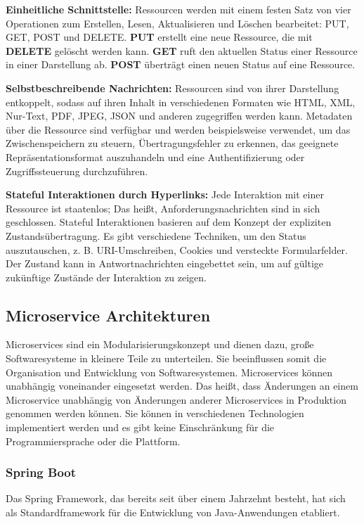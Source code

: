 \textbf{Einheitliche Schnittstelle:} Ressourcen werden mit einem festen Satz von vier Operationen zum Erstellen, Lesen, Aktualisieren und Löschen bearbeitet: PUT, GET, POST und DELETE. \textbf{PUT} erstellt eine neue Ressource, die mit \textbf{DELETE} gelöscht werden kann. \textbf{GET} ruft den aktuellen Status einer Ressource in einer Darstellung ab. \textbf{POST} überträgt einen neuen Status auf eine Ressource.

\textbf{Selbstbeschreibende Nachrichten:} Ressourcen sind von ihrer Darstellung entkoppelt, sodass auf ihren Inhalt in verschiedenen Formaten wie HTML, XML, Nur-Text, PDF, JPEG, JSON und anderen zugegriffen werden kann. Metadaten über die Ressource sind verfügbar und werden beispielsweise verwendet, um das Zwischenspeichern zu steuern, Übertragungsfehler zu erkennen, das geeignete Repräsentationsformat auszuhandeln und eine Authentifizierung oder Zugriffssteuerung durchzuführen.

\textbf{Stateful Interaktionen durch Hyperlinks:} Jede Interaktion mit einer Ressource ist staatenlos; Das heißt, Anforderungsnachrichten sind in sich geschlossen. Stateful Interaktionen basieren auf dem Konzept der expliziten Zustandsübertragung. Es gibt verschiedene Techniken, um den Status auszutauschen, z. B. URI-Umschreiben, Cookies und versteckte Formularfelder. Der Zustand kann in Antwortnachrichten eingebettet sein, um auf gültige zukünftige Zustände der Interaktion zu zeigen.

\subsection{Microservice Architekturen}

Microservices sind ein Modularisierungskonzept und dienen dazu, große Softwaresysteme in kleinere Teile zu unterteilen. Sie beeinflussen somit die Organisation und Entwicklung von Softwaresystemen. Microservices können unabhängig voneinander eingesetzt werden. Das heißt, dass Änderungen an einem Microservice unabhängig von Änderungen anderer Microservices in Produktion genommen werden können. Sie können in verschiedenen Technologien implementiert werden und es gibt keine Einschränkung für die Programmiersprache oder die Plattform\cite[45--46]{wolff2016microservices}.

\subsubsection{Spring Boot}

Das Spring Framework, das bereits seit über einem Jahrzehnt besteht, hat sich als Standardframework für die Entwicklung von Java-Anwendungen etabliert.

